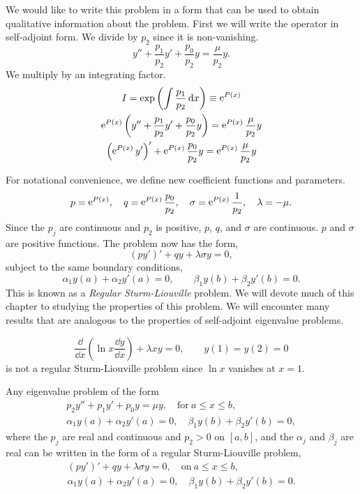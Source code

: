 We would like to write this problem in a form that can be used to obtain
qualitative information about the problem.  First we will write the
operator in self-adjoint form.  We divide by $p_2$ since it is non-vanishing.
\[
y'' + \frac{p_1}{p_2} y' + \frac{p_0}{p_2} y = \frac{\mu}{p_2} y.
\]
We multiply by an integrating factor.
\[
\]
\begin{gather*}
  I = \exp \left( \int \frac{p_1}{p_2}\,\mathrm{d} x \right) \equiv \mathop{\mathrm{e}}\nolimits^{P(x)}
  \\
  \mathop{\mathrm{e}}\nolimits^{P(x)} \left( y'' + \frac{p_1}{p_2} y' + \frac{p_0}{p_2} y
  \right) = \mathop{\mathrm{e}}\nolimits^{P(x)} \frac{\mu}{p_2} y 
  \\
  \left( \mathop{\mathrm{e}}\nolimits^{P(x)} y' \right)' + \mathop{\mathrm{e}}\nolimits^{P(x)} \frac{p_0}{p_2} y  = \mathop{\mathrm{e}}\nolimits^{P(x)} \frac{\mu}{p_2} y
\end{gather*}

For notational convenience, we define new coefficient functions and parameters.
\[ 
p = \mathop{\mathrm{e}}\nolimits^{P(x)}, \quad 
q = \mathop{\mathrm{e}}\nolimits^{P(x)} \frac{p_0}{p_2}, \quad
\sigma = \mathop{\mathrm{e}}\nolimits^{P(x)} \frac{1}{p_2}, \quad
\lambda = -\mu.
\]
Since the $p_j$ are continuous and $p_2$ is positive, $p$, $q$, and $\sigma$
are continuous.  $p$ and $\sigma$ are positive functions.
The problem now has the form,
\[ 
(p y')' + q y + \lambda \sigma y = 0,
\]
subject to the same boundary conditions,
\[ 
\alpha_1 y(a) + \alpha_2 y'(a) = 0, \qquad
\beta_1 y(b) + \beta_2 y'(b) = 0. 
\]
This is known as a \textit{Regular Sturm-Liouville} problem.  
We will devote 
much of this chapter to studying the properties of this problem.  We will
encounter many results that are analogous to the properties of 
self-adjoint eigenvalue problems.






\begin{Example}
  \[ 
  \frac{\dd}{\dd x}\left( \ln x \frac{\dd y}{\dd x}\right) + \lambda x y = 0,
  \qquad y(1) = y(2) = 0
  \]
  is not a regular Sturm-Liouville problem since $\ln x$ vanishes at $x = 1$.
\end{Example}





\begin{Result}
  Any eigenvalue problem of the form
  \begin{gather*}
    p_2 y'' + p_1 y' + p_0 y = \mu y, \quad \mathrm{for}\ a \leq x \leq b,
    \\
    \alpha_1 y(a) + \alpha_2 y'(a) = 0, \quad \beta_1 y(b) + \beta_2 y'(b) = 0,
  \end{gather*}
  where the $p_j$ are real and continuous and $p_2 > 0$ on $[a,b]$, and 
  the $\alpha_j$ and $\beta_j$ are real can be written in the form of a regular 
  Sturm-Liouville problem,
  \begin{gather*}
    (p y')' + q y + \lambda \sigma y = 0, \quad \mathrm{on}\ a \leq x \leq b, 
    \\
    \alpha_1 y(a) + \alpha_2 y'(a) = 0, \quad \beta_1 y(b) + \beta_2 y'(b) = 0.
  \end{gather*}
\end{Result}









